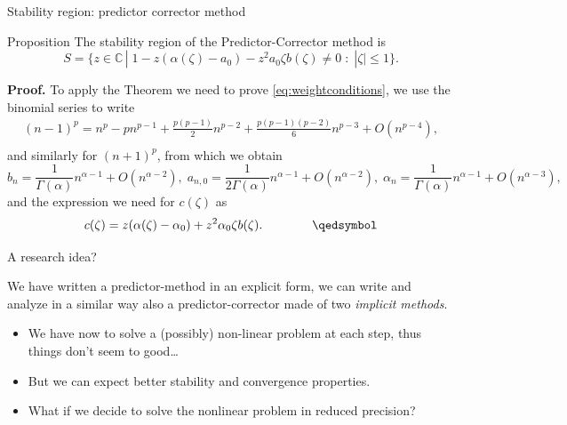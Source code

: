 \documentclass[aspectratio=169,xcolor=dvipsnames]{beamer}
\begin{document}
\begin{frame}{Stability region: predictor corrector method}
\begin{alertblock}{Proposition}
	The stability region of the Predictor-Corrector method is
	\[
	S = \{ z \in \mathbb{C}\,|\; 1- z(\alpha(\zeta) - a_0) - z^2 a_0 \zeta b(\zeta) \neq 0\;:\;|\zeta| \leq 1 \}.
	\]
\end{alertblock}

\textbf{Proof.} To apply the Theorem we need to prove \eqref{eq:weightconditions}, we use the binomial series to write
\[
\begin{split}
(n-1)^p = n^p - pn^{p-1} + \frac{p(p-1)}{2} n^{p-2} + \frac{p(p-1)(p-2)}{6}n^{p-3} + O(n^{p-4}),\\
\end{split}
\]
and similarly for $(n+1)^p$, from which we obtain
\[
b_n = \frac{1}{\Gamma(\alpha)} n^{\alpha-1} + O(n^{\alpha-2}), \; a_{n,0} = \frac{1}{2\Gamma(\alpha)} n^{\alpha-1} + O(n^{\alpha-2}), \; \alpha_n = \frac{1}{\Gamma(\alpha)} n^{\alpha-1} + O(n^{\alpha-3}),
\]
and the expression we need for $c(\zeta)$ as
\[
c(\zeta) = z(\alpha(\zeta) - \alpha_0) + z^2 \alpha_0 \zeta b(\zeta). \qquad\qquad\qedsymbol
\]

\end{frame}

\begin{frame}{\faBinoculars\;  A research idea?}

We have written a predictor-method in an explicit form, we can write and analyze in a similar way also a predictor-corrector made of two \emph{implicit methods}.
\begin{itemize}
	\item We have now to solve a (possibly) non-linear problem at each step, thus things don't seem to good\ldots
	\item But we can expect better stability and convergence properties.
	\item<2->[\faLightbulb] What if we decide to \alert{solve the nonlinear problem in reduced precision}? 
\end{itemize}




\end{frame}
\end{document}
